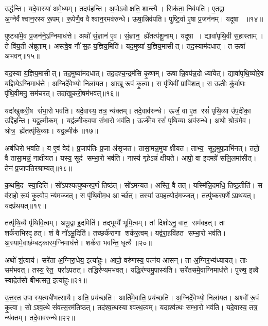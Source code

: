 उद्ध॑न्ति। यदे॒वास्या॑ अमे॒ध्यम्। तदप॑हन्ति। अ॒पोऽवोक्षति॒ शान्त्यै। सिक॑ता॒ निव॑पति। ए॒तद्वा अ॒ग्नेर्वैश्वान॒रस्य॑ रू॒पम्। रू॒पेणै॒व वैश्वान॒रमव॑रुन्धे। ऊषा॒न्निव॑पति। पुष्टि॒र्वा ए॒षा प्र॒जन॑नम्। यदूषा ॥१४॥

पुष्ट्या॑मे॒व प्र॒जन॑ने॒ऽग्निमाध॑त्ते। अथो॑ सं॒ज्ञान॑ ए॒व। सं॒ज्ञान॒ ह्ये॑तत्प॑शू॒नाम्। यदूषा। द्यावा॑पृथि॒वी स॒हास्ताम्। ते वि॑य॒ती अ॑ब्रूताम्। अस्त्वे॒व नौ॑ स॒ह य॒ज्ञिय॒मिति॑। यद॒मुष्या॑ य॒ज्ञिय॒मासीत्। तद॒स्याम॑दधात्। त ऊषा॑ अभवन्॥१५॥

यद॒स्या य॒ज्ञिय॒मासीत्। तद॒मुष्या॑मदधात्। तद॒दश्च॒न्द्रम॑सि कृ॒ष्णम्। ऊषान्नि॒वप॑न्न॒दो ध्या॑येत्। द्यावा॑पृथि॒व्योरे॒व य॒ज्ञिये॒ऽग्निमाध॑त्ते। अ॒ग्निर्दे॒वेभ्यो॒ निला॑यत। आ॒खू रू॒पं कृ॒त्वा। स पृ॑थि॒वीं प्रावि॑शत्। स ऊ॒तीः कु॑र्वा॒णः पृ॑थि॒वीमनु॒ सम॑चरत्। तदा॑खुकरी॒षम॑भवत्॥१६॥

यदा॑खुकरी॒ष सं॑भा॒रो भव॑ति। यदे॒वास्य॒ तत्र॒ न्य॑क्तम्। तदे॒वाव॑रुन्धे। ऊर्जं॒ वा ए॒त रसं॑ पृथि॒व्या उ॑प॒दीका॒ उद्दि॑हन्ति। यद्व॒ल्मीकम्। यद्व॑ल्मीकव॒पा सं॑भा॒रो भव॑ति। ऊर्ज॑मे॒व रसं॑ पृथि॒व्या अव॑रुन्धे। अथो॒ श्रोत्र॑मे॒व। श्रोत्र॒ ह्ये॑तत्पृ॑थि॒व्याः। यद्व॒ल्मीक॑॥१७॥

अब॑धिरो भवति। य ए॒वं वेद॑। प्र॒जाप॑तिः प्र॒जा अ॑सृजत। तासा॒मन्न॒मुपाक्षीयत। ताभ्य॒ सूद॒मुप॒प्राभि॑नत्। ततो॒ वै तासा॒मन्नं॒ नाक्षी॑यत। यस्य॒ सूद॑ सम्भा॒रो भव॑ति। नास्य॑ गृ॒हेऽन्नं॑ क्षीयते। आपो॒ वा इ॒दमग्रे॑ सलि॒लमा॑सीत्। तेन॑ प्र॒जाप॑तिरश्राम्यत्॥१८॥

क॒थमि॒द स्या॒दिति॑। सो॑ऽपश्यत्पुष्करप॒र्णं तिष्ठ॑त्। सो॑ऽमन्यत। अस्ति॒ वै तत्। यस्मि॑न्नि॒दमधि॒ तिष्ठ॒तीति॑। स व॑रा॒हो रू॒पं कृ॒त्वोप॒ न्य॑मज्जत्। स पृ॑थि॒वीम॒ध आर्च्छत्। तस्या॑ उप॒हत्योद॑मज्जत्। तत्पु॑ष्करप॒र्णेऽप्रथयत्। यदप्र॑थयत्॥१९॥

तत्पृ॑थि॒व्यै पृ॑थिवि॒त्वम्। अभू॒द्वा इ॒दमिति॑। तद्भूम्यै॑ भूमि॒त्वम्। तां दिशोऽनु॒ वात॒ सम॑वहत्। ता शर्क॑राभिरदृहत्। शं वै नो॑ऽभू॒दिति॑। तच्छर्क॑राणा शर्कर॒त्वम्। यद्व॑रा॒हवि॑हत सम्भा॒रो भव॑ति। अ॒स्यामे॒वाछ॑म्बट्कारम॒ग्निमाध॑त्ते। शर्क॑रा भवन्ति॒ धृत्यै॥२०॥

अथो॑ शं॒त्वाय॑। सरे॑ता अ॒ग्निरा॒धेय॒ इत्या॑हुः। आपो॒ वरु॑णस्य॒ पत्न॑य आसन्। ता अ॒ग्निर॒भ्य॑ध्यायत्। ताः सम॑भवत्। तस्य॒ रेत॒ परा॑ऽपतत्। तद्धिर॑ण्यमभवत्। यद्धिर॑ण्यमु॒पास्य॑ति। सरे॑तसमे॒वाग्निमाध॑त्ते। पुरु॑ष॒ इन्न्वै स्वाद्रेत॑सो बीभत्सत॒ इत्या॑हुः॥२१॥

उ॒त्त॒र॒त उपास्य॒त्यबी॑भत्सायै। अति॒ प्रय॑च्छति। आर्ति॑मे॒वाति॒ प्रय॑च्छति। अ॒ग्निर्दे॒वेभ्यो॒ निला॑यत। अश्वो॑ रू॒पं कृ॒त्वा। सोऽश्व॒त्थे सं॑वत्स॒रम॑तिष्ठत्। तद॑श्व॒त्थस्याश्वत्थ॒त्वम्। यदाश्व॑त्थः सम्भा॒रो भव॑ति। यदे॒वास्य॒ तत्र॒ न्य॑क्तम्। तदे॒वाव॑रुन्धे॥२२॥

